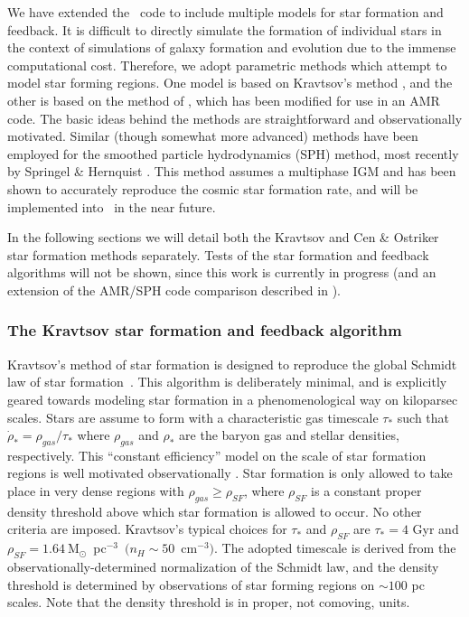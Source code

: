 We have extended the \enzo\ code to include multiple models for star formation
and feedback.  It is difficult to directly simulate the formation of individual
stars in the context of simulations of galaxy formation and evolution due
to the immense computational cost.  Therefore, 
we adopt parametric methods which attempt
to model star forming regions.  One model is based on Kravtsov's method
 \citep{2003ApJ...590L...1K}, and the other is based on the method of 
\citet{CO1992}, which has been modified for use in an AMR code.  The basic
ideas behind the methods are straightforward and observationally motivated.
Similar (though somewhat more advanced) methods have been employed for the 
smoothed particle hydrodynamics
(SPH) method, most recently by Springel \& Hernquist 
\citep{sh03a,sh03b,hs03}. This 
method assumes a
multiphase IGM and has been shown to accurately reproduce the cosmic star
formation rate, and will be implemented into \enzo\ in the near future.

In the following sections we will detail both the Kravtsov and Cen \& Ostriker
star formation methods separately.  Tests of the star formation and
feedback algorithms will not be shown, since this work is currently in
progress (and an extension of the AMR/SPH code comparison described in
\citet{2005ApJS..160....1O}).

\subsubsection{The Kravtsov star formation and feedback algorithm}

Kravtsov's method of star formation is designed to reproduce
the global Schmidt law of star 
formation~\citep{2003ApJ...590L...1K,1959ApJ...129..243S}.
This algorithm is deliberately minimal, and is explicitly geared
towards modeling star formation in a phenomenological way on kiloparsec
scales.  Stars are assume to form with a characteristic gas timescale 
$\tau_*$ such that $\dot{\rho}_* = \rho_{gas}/\tau_*$ where $\rho_{gas}$ 
and $\rho_*$ are the baryon gas and stellar densities, respectively.  
This ``constant efficiency'' model on the scale of star formation 
regions is well motivated observationally \citep{1996AJ....112.1903Y,2002ApJ...569..157W}.  
Star formation is only allowed to take place in very dense regions
with $\rho_{gas} \geq \rho_{SF}$, where $\rho_{SF}$ is a constant
proper density threshold above which star formation is allowed to
occur.  No other criteria are imposed.  Kravtsov's typical choices
for $\tau_*$ and $\rho_{SF}$ are $\tau_* = 4$ Gyr and $\rho_{SF} =
1.64~$M$_\odot$~pc$^{-3}$~$(n_H \sim 50$~cm$^{-3})$.  The adopted timescale
is derived from the observationally-determined normalization of the
Schmidt law, and the density threshold is determined by observations
of star forming regions on $\sim 100$ pc scales.  Note that the density
threshold is in proper, not comoving, units.

